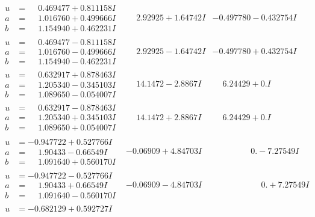 \documentclass[1p]{elsarticle_modified}
\theoremstyle{definition}
\begin{document}
$$\begin{array}{c|c|c}
\begin{aligned}
u &= \phantom{-}0.469477 + 0.811158 I \\
a &= \phantom{-}1.016760 + 0.499666 I \\
b &= \phantom{-}1.154940 + 0.462231 I\end{aligned}
 & \phantom{-}2.92925 + 1.64742 I & -0.497780 - 0.432754 I \\ \hline\begin{aligned}
u &= \phantom{-}0.469477 - 0.811158 I \\
a &= \phantom{-}1.016760 - 0.499666 I \\
b &= \phantom{-}1.154940 - 0.462231 I\end{aligned}
 & \phantom{-}2.92925 - 1.64742 I & -0.497780 + 0.432754 I \\ \hline\begin{aligned}
u &= \phantom{-}0.632917 + 0.878463 I \\
a &= \phantom{-}1.205340 - 0.345103 I \\
b &= \phantom{-}1.089650 - 0.054007 I\end{aligned}
 & \phantom{-}14.1472 - 2.8867 I & \phantom{-}6.24429 + 0. I\phantom{ +0.000000I} \\ \hline\begin{aligned}
u &= \phantom{-}0.632917 - 0.878463 I \\
a &= \phantom{-}1.205340 + 0.345103 I \\
b &= \phantom{-}1.089650 + 0.054007 I\end{aligned}
 & \phantom{-}14.1472 + 2.8867 I & \phantom{-}6.24429 + 0. I\phantom{ +0.000000I} \\ \hline\begin{aligned}
u &= -0.947722 + 0.527766 I \\
a &= \phantom{-}1.90433 - 0.66549 I \\
b &= \phantom{-}1.091640 + 0.560170 I\end{aligned}
 & -0.06909 + 4.84703 I & \phantom{-0.000000 } 0. - 7.27549 I \\ \hline\begin{aligned}
u &= -0.947722 - 0.527766 I \\
a &= \phantom{-}1.90433 + 0.66549 I \\
b &= \phantom{-}1.091640 - 0.560170 I\end{aligned}
 & -0.06909 - 4.84703 I & \phantom{-0.000000 -}0. + 7.27549 I \\ \hline\begin{aligned}
u &= -0.682129 + 0.592727 I \\

\end{aligned}
\end{array}$$
\end{document}
